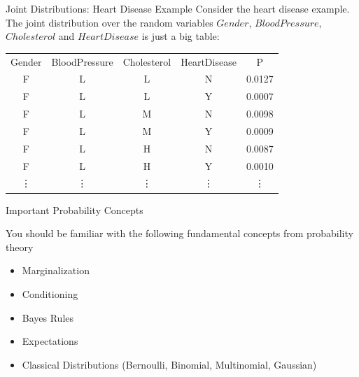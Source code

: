 \documentclass[serif,xcolor=pdftex,dvipsnames,table,hyperref={bookmarks=false,breaklinks}]{beamer}
\begin{document}
\begin{frame}[t]{Joint Distributions: Heart Disease Example}
Consider the heart disease example. The joint distribution over the random variables $Gender$, $BloodPressure$, $Cholesterol$ and $HeartDisease$ is just a big table:
\medskip 

  \pause
  \centering
  \begin{tabular}{ccccc}
    \rowcolor{gray!50}
      Gender & BloodPressure & Cholesterol  & HeartDisease & P\\
      F      & L       & L            & N             & 0.0127 \\
      F      & L       & L            & Y             & 0.0007 \\
      F      & L       & M            & N             & 0.0098 \\
      F      & L       & M            & Y             & 0.0009 \\
      F      & L       & H            & N             & 0.0087 \\
      F      & L       & H            & Y             & 0.0010 \\
     \vdots  & \vdots  & \vdots       & \vdots        & \vdots                
  \end{tabular}

\end{frame}



\begin{frame}[t]{Important Probability Concepts}

You should be familiar with the following fundamental concepts from probability theory

\pause
\begin{itemize}[<+->]
\item Marginalization
\item Conditioning
\item Bayes Rules
\item Expectations
\item Classical Distributions (Bernoulli, Binomial, Multinomial, Gaussian)
\end{itemize}

\end{frame}
\end{document}
